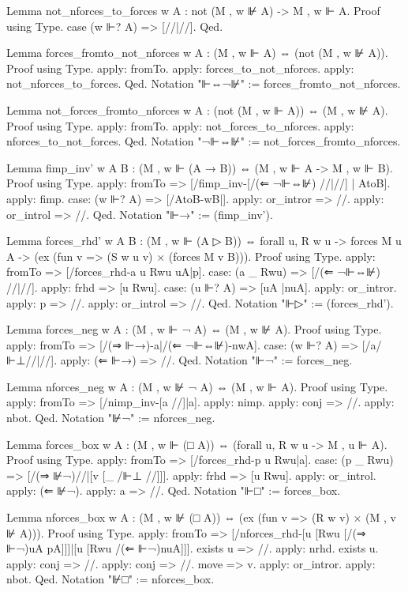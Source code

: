 \begin{spverbatim}
Lemma not_nforces_to_forces {w A} : not (M , w ⊮ A) -> M , w ⊩ A.
Proof using Type.
  case (w ⊩? A) => [//|//].
Qed.

Lemma forces_fromto_not_nforces {w A} : (M , w ⊩ A) ⇔ (not (M , w ⊮ A)).
Proof using Type.
  apply: fromTo.
  apply: forces_to_not_nforces.
  apply: not_nforces_to_forces.
Qed.
Notation "⊩⇔¬⊮" := forces_fromto_not_nforces.

Lemma not_forces_fromto_nforces {w A} : (not (M , w ⊩ A)) ⇔ (M , w ⊮ A).
Proof using Type.
  apply: fromTo.
  apply: not_forces_to_nforces.
  apply: nforces_to_not_forces.
Qed.
Notation "¬⊩⇔⊮" := not_forces_fromto_nforces.

Lemma fimp_inv' {w A B} : (M , w ⊩ (A → B)) ⇔ (M , w ⊩ A -> M , w ⊩ B).
Proof using Type.
  apply: fromTo => [/fimp_inv-[/(⇐ ¬⊩⇔⊮)  //|//]
                  | AtoB].
  apply: fimp.
  case: (w ⊩? A) => [/AtoB-wB|].
  apply: or_intror => //.
  apply: or_introl => //.
Qed.
Notation "⊩→" := (fimp_inv').

Lemma forces_rhd' {w A B} :
  (M , w ⊩ (A ▷ B)) ⇔
    forall {u}, R w u -> forces M u A -> (ex (fun v => (S w u v) × (forces M v B))).
Proof using Type.
  apply: fromTo => [/forces_rhd-a u Rwu uA|p].
  case: (a _ Rwu) => [/(⇐ ¬⊩⇔⊮) //|//].
  apply: frhd => [u Rwu].
  case: (u ⊩? A) => [uA |nuA].
  apply: or_intror. apply: p => //.
  apply: or_introl => //.
Qed.
Notation "⊩▷" := (forces_rhd').

Lemma forces_neg {w A} : (M , w ⊩ ¬ A) ⇔ (M , w ⊮ A).
Proof using Type.
  apply: fromTo => [/(⇒ ⊩→)-a|/(⇐ ¬⊩⇔⊮)-nwA].
  case: (w ⊩? A) => [/a/⊩⊥//|//].
  apply: (⇐ ⊩→) => //.
Qed.
Notation "⊩¬" := forces_neg.

Lemma nforces_neg {w A} : (M , w ⊮ ¬ A) ⇔ (M , w ⊩ A).
Proof using Type.
  apply: fromTo => [/nimp_inv-[a //]|a].
  apply: nimp. apply: conj => //. apply: nbot.
Qed.
Notation "⊮¬" := nforces_neg.

Lemma forces_box {w A} :
  (M , w ⊩ (□ A)) ⇔ (forall {u}, R w u -> M , u ⊩ A).
Proof using Type.
  apply: fromTo => [/forces_rhd-p u Rwu|a].
  case: (p _ Rwu) => [/(⇒ ⊮¬)//|[v [_ /⊩⊥ //]]].
  apply: frhd => [u Rwu]. apply: or_introl.
  apply: (⇐ ⊮¬). apply: a => //.
Qed.
Notation "⊩□" := forces_box.

Lemma nforces_box {w A} :
  (M , w ⊮ (□ A)) ⇔ (ex (fun v => (R w v) × (M , v ⊮ A))).
Proof using Type.
  apply: fromTo => [/nforces_rhd-[u [Rwu [/(⇒ ⊩¬)uA pA]]]|[u [Rwu /(⇐ ⊩¬)nuA]]].
  exists u => //.
  apply: nrhd. exists u. apply: conj => //. apply: conj => //.
  move => v. apply: or_intror. apply: nbot.
Qed.
Notation "⊮□" := nforces_box.


\end{spverbatim}
